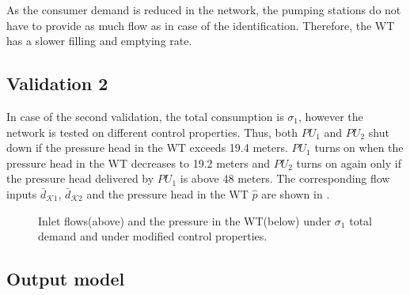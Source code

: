  \vspace{-3mm}

 As the consumer demand is reduced in the network, the pumping stations do not have to provide as much flow as in case of the identification. Therefore, the WT has a slower filling and emptying rate. 

 \subsection{Validation 2}
 \label{validation_2}

 In case of the second validation, the total consumption is $\sigma_1$, however the network is tested on different control properties. Thus, both $PU_1$ and $PU_2$ shut down if the pressure head in the WT exceeds 19.4 meters. $PU_1$ turns on when the pressure head in the WT decreases to 19.2 meters and $PU_2$ turns on again only if the pressure head delivered by $PU_1$ is above 48 meters. The corresponding flow inputs $\bar{d}_{\mathcal{K}1}$, $\bar{d}_{\mathcal{K}2}$ and the pressure head in the WT $\hat{p}$ are shown in .

 \vspace{-3mm}

 \begin{figure}[H]
 \centering
  
 \vspace{-2.5mm}
 \end{figure}

 \vspace{-5.5mm}

 \begin{figure}[H]
 \centering
 \hspace{-4.5mm}
  
 \vspace{-2.5mm}
 \caption{Inlet flows(above) and the pressure in the WT(below) under $\sigma_1$ total demand and under modified control properties.}
 \label{fig:identification_example1_v2}
 \end{figure}

 \vspace{-3mm}

 \subsection{Output model}
 \label{output model}

